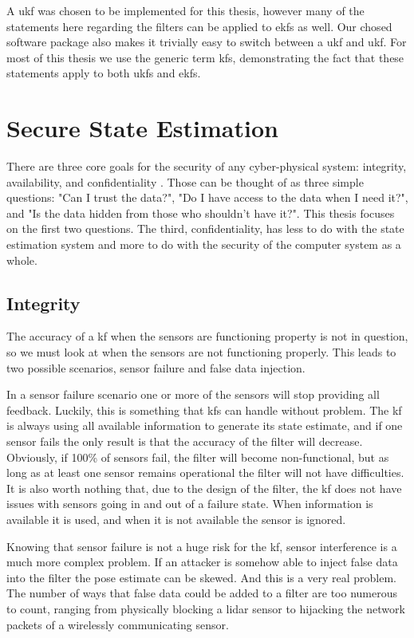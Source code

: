 \documentclass[thesis.tex]{subfile}
\begin{document}
A \gls{ukf} was chosen to be implemented for this thesis, however many of the statements here regarding the filters can be applied to \glspl{ekf} as well. Our chosed software package also makes it trivially easy to switch between a \gls{ukf} and \gls{ukf}. For most of this thesis we use the generic term \glspl{kf}, demonstrating the fact that these statements apply to both \glspl{ukf} and \glspl{ekf}.

\section{Secure State Estimation}
There are three core goals for the security of any cyber-physical system: integrity, availability, and confidentiality \cite{Cardenas2008}. Those can be thought of as three simple questions: "Can I trust the data?", "Do I have access to the data when I need it?", and "Is the data hidden from those who shouldn't have it?". This thesis focuses on the first two questions. The third, confidentiality, has less to do with the state estimation system and more to do with the security of the computer system as a whole.

\subsection{Integrity}
The accuracy of a \gls{kf} when the sensors are functioning property is not in question, so we must look at when the sensors are not functioning properly. This leads to two possible scenarios, sensor failure and false data injection.

In a sensor failure scenario one or more of the sensors will stop providing all feedback. Luckily, this is something that \glspl{kf} can handle without problem. The \gls{kf} is always using all available information to generate its state estimate, and if one sensor fails the only result is that the accuracy of the filter will decrease. Obviously, if 100\% of sensors fail, the filter will become non-functional, but as long as at least one sensor remains operational the filter will not have difficulties. It is also worth nothing that, due to the design of the filter, the \gls{kf} does not have issues with sensors going in and out of a failure state. When information is available it is used, and when it is not available the sensor is ignored.

Knowing that sensor failure is not a huge risk for the \gls{kf}, sensor interference is a much more complex problem. If an attacker is somehow able to inject false data into the filter the pose estimate can be skewed. And this is a very real problem. The number of ways that false data could be added to a filter are too numerous to count, ranging from physically blocking a lidar sensor to hijacking the network packets of a wirelessly communicating sensor.
\end{document}
